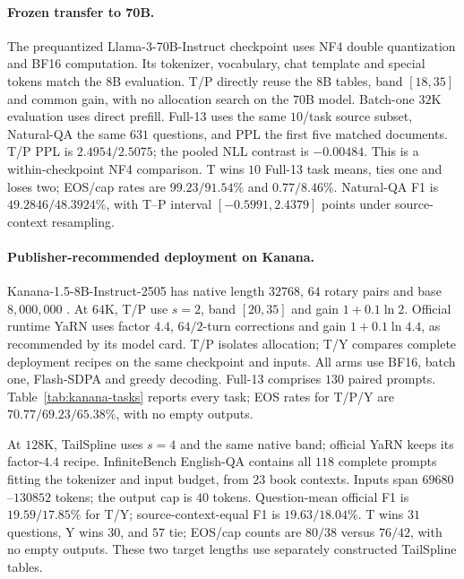 \paragraph{Frozen transfer to 70B.}
The prequantized Llama-3-70B-Instruct checkpoint uses NF4 double quantization
and BF16 computation. Its tokenizer, vocabulary, chat template and special
tokens match the $8$B evaluation. T/P directly reuse the $8$B tables, band
$[18,35]$ and common gain, with no allocation search on the $70$B model.
Batch-one $32$K evaluation uses direct prefill. Full-13 uses the same
$10$/task source subset, Natural-QA the same $631$ questions, and PPL the
first five matched documents. T/P PPL is $2.4954/2.5075$; the pooled NLL
contrast is $-0.00484$. This is a within-checkpoint NF4 comparison.
T wins $10$ Full-13 task means, ties one and loses two; EOS/cap rates are
$99.23/91.54\%$ and $0.77/8.46\%$. Natural-QA F1 is $49.2846/48.3924\%$,
with T--P interval $[-0.5991,2.4379]$ points under source-context resampling.
\FloatBarrier

\paragraph{Publisher-recommended deployment on Kanana.}
Kanana-1.5-8B-Instruct-2505 has native length $32768$, $64$ rotary pairs
and base $8{,}000{,}000$ \citep{kanana2025model}. At $64$K, T/P use $s=2$,
band $[20,35]$ and gain $1+0.1\ln2$. Official runtime YaRN uses factor
$4.4$, $64/2$-turn corrections and gain $1+0.1\ln4.4$, as recommended
by its model card. T/P isolates allocation; T/Y compares complete deployment
recipes on the same checkpoint and inputs. All arms use BF16, batch one,
Flash-SDPA and greedy decoding. Full-13 comprises $130$ paired prompts.
Table~\ref{tab:kanana-tasks} reports every task; EOS rates for T/P/Y are
$70.77/69.23/65.38\%$, with no empty outputs.


At $128$K, TailSpline uses $s=4$ and the same native band; official YaRN keeps
its factor-$4.4$ recipe. InfiniteBench English-QA contains all $118$ complete
prompts fitting the tokenizer and input budget, from $23$ book contexts.
Inputs span $69680$--$130852$ tokens; the output cap is $40$ tokens.
Question-mean official F1 is $19.59/17.85\%$ for T/Y; source-context-equal
F1 is $19.63/18.04\%$. T wins $31$ questions, Y wins $30$, and $57$ tie;
EOS/cap counts are $80/38$ versus $76/42$, with no empty outputs.
These two target lengths use separately constructed TailSpline tables.
\FloatBarrier


